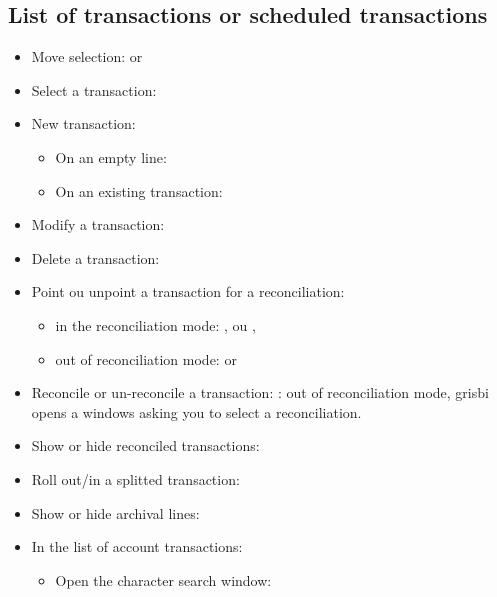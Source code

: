 \subsection{List of transactions or scheduled transactions}%

\begin{itemize}
	\item Move selection: \keys{\arrowkeyup} or \keys{\arrowkeydown}%
	\item Select a transaction: %
	\item New transaction:%
	\begin{itemize}
		\item On an empty line: %
		\item On an existing transaction: %
	\end{itemize}
	\item Modify a transaction: %
	\item Delete a transaction: %
	\item Point ou unpoint a transaction for a reconciliation:%
		\begin{itemize}
			\item in the reconciliation mode: ,  ou ,
			\item out of reconciliation mode:  or 
		\end{itemize}
	\item Reconcile or un-reconcile a transaction: \newline
	\Note{}: out of reconciliation mode, grisbi opens a windows asking you to select a reconciliation.
	\item Show or hide reconciled transactions: %
	\item Roll out/in a splitted transaction: %
	\item Show or hide archival lines: %
	\item In the list of account transactions:%
	\begin{itemize}
		\item Open the character search window: %
	\end{itemize}
\end{itemize}


